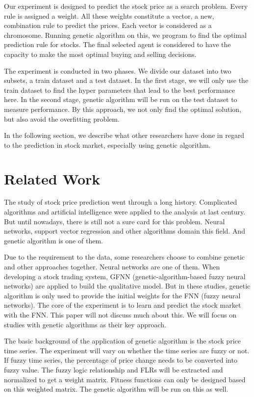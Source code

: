 \documentclass{article}
\begin{document}
Our experiment is designed to predict the stock price as a search problem.
Every rule is assigned a weight.
All these weights constitute a vector, a new, combination rule to predict the prices.
Each vector is considered as a chromosome.
Running genetic algorithm on this, we program to find the optimal prediction rule for stocks.
The final selected agent is considered to have the capacity to make the most optimal buying and selling decisions.

The experiment is conducted in two phases.
We divide our dataset into two subsets, a train dataset and a test dataset.
In the first stage, we will only use the train dataset to find the hyper parameters that lead to the best performance here.
In the second stage, genetic algorithm will be run on the test dataset to measure performance.
By this approach, we not only find the optimal solution, but also avoid the overfitting problem.

In the following section, we describe what other researchers have done in regard to the prediction in stock market, especially using genetic algorithm.

\section{Related Work}

The study of stock price prediction went through a long history.
Complicated algorithms and artificial intelligence were applied to the analysis at last century. \cite{mizuno1998application}
But until nowadays, there is still not a sure card for this problem.
Neural networks, support vector regression and other algorithms domain this field. \cite{schumaker2009textual}
And genetic algorithm is one of them.

Due to the requirement to the data, some researchers choose to combine genetic and other approaches together.
Neural networks are one of them.
When developing a stock trading system, GFNN (genetic-algorithm-based fuzzy neural networks)
are applied to build the qualitative model.
But in these studies, genetic algorithm is only used to provide the initial weights
for the FNN (fuzzy neural networks). \cite{kuo2001intelligent}
The core of the experiment is to learn and predict the stock market with the FNN.
This paper will not discuss much about this.
We will focus on studies with genetic algorithms as their key approach.

The basic background of the application of genetic algorithm is the stock price time series.
The experiment will vary on whether the time series are fuzzy or not.
If fuzzy time series, the percentage of price change needs to be converted into fuzzy value.
The fuzzy logic relationship and FLRs will be extracted and normalized to get a weight matrix. \cite{cai2013novel}
Fitness functions can only be designed based on this weighted matrix.
The genetic algorithm will be run on this as well.
\end{document}
